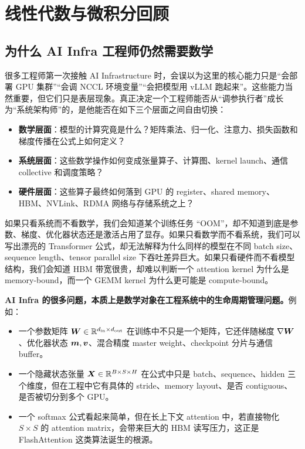 \chapter{线性代数与微积分回顾}
\label{chap:math-foundations}

\section{为什么 AI Infra 工程师仍然需要数学}
\label{sec:why-math-for-ai-infra}

很多工程师第一次接触 AI Infrastructure 时，会误以为这里的核心能力只是“会部署 GPU 集群”“会调 NCCL 环境变量”“会把模型用 vLLM 跑起来”。这些能力当然重要，但它们只是表层现象。真正决定一个工程师能否从“调参执行者”成长为“系统架构师”的，是他能否在如下三个层面之间自由切换：

\begin{itemize}
  \item \textbf{数学层面}：模型的计算究竟是什么？矩阵乘法、归一化、注意力、损失函数和梯度传播在公式上如何定义？
  \item \textbf{系统层面}：这些数学操作如何变成张量算子、计算图、kernel launch、通信 collective 和调度策略？
  \item \textbf{硬件层面}：这些算子最终如何落到 GPU 的 register、shared memory、HBM、NVLink、RDMA 网络与存储系统之上？
\end{itemize}

如果只看系统而不看数学，我们会知道某个训练任务 ``OOM''，却不知道到底是参数、梯度、优化器状态还是激活占用了显存。如果只看数学而不看系统，我们可以写出漂亮的 Transformer 公式，却无法解释为什么同样的模型在不同 batch size、sequence length、tensor parallel size 下吞吐差异巨大。如果只看硬件而不看模型结构，我们会知道 HBM 带宽很贵，却难以判断一个 attention kernel 为什么是 memory-bound，而一个 GEMM kernel 为什么更可能是 compute-bound。

\textbf{AI Infra 的很多问题，本质上是数学对象在工程系统中的生命周期管理问题。}例如：

\begin{itemize}
  \item 一个参数矩阵 $\bm{W}\in\mathbb{R}^{d_{\mathrm{in}}\times d_{\mathrm{out}}}$ 在训练中不只是一个矩阵，它还伴随梯度 $\nabla \bm{W}$、优化器状态 $\bm{m},\bm{v}$、混合精度 master weight、checkpoint 分片与通信 buffer。
  \item 一个隐藏状态张量 $\bm{X}\in\mathbb{R}^{B\times S\times H}$ 在公式中只是 batch、sequence、hidden 三个维度，但在工程中它有具体的 stride、memory layout、是否 contiguous、是否被切分到多个 GPU。
  \item 一个 softmax 公式看起来简单，但在长上下文 attention 中，若直接物化 $S\times S$ 的 attention matrix，会带来巨大的 HBM 读写压力，这正是 FlashAttention 这类算法诞生的根源。
\end{itemize}

